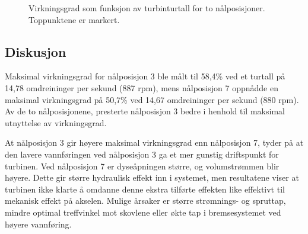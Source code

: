 \begin{figure}[H]
\centering
{}
\caption{Virkningsgrad som funksjon av turbinturtall for to nålposisjoner. Toppunktene er markert.}
\label{fig:virkningsgrad}
\end{figure}

\subsection{Diskusjon}
Maksimal virkningsgrad for nålposisjon 3 ble målt til 58,4\% ved et turtall på 14,78 omdreininger per sekund (887 rpm), mens nålposisjon 7 oppnådde en maksimal virkningsgrad på 50,7\% ved 14,67 omdreininger per sekund (880 rpm). Av de to nålposisjonene, presterte nålposisjon 3 bedre i henhold til maksimal utnyttelse av virkningsgrad.

At nålposisjon 3 gir høyere maksimal virkningsgrad enn nålposisjon 7, tyder på at den lavere vannføringen ved nålposisjon 3 ga et mer gunstig driftspunkt for turbinen. Ved nålposisjon 7 er dyseåpningen større, og volumstrømmen blir høyere. Dette gir større hydraulisk effekt inn i systemet, men resultatene viser at turbinen ikke klarte å omdanne denne ekstra tilførte effekten like effektivt til mekanisk effekt på akselen. Mulige årsaker er større strømnings- og spruttap, mindre optimal treffvinkel mot skovlene eller økte tap i bremsesystemet ved høyere vannføring.

